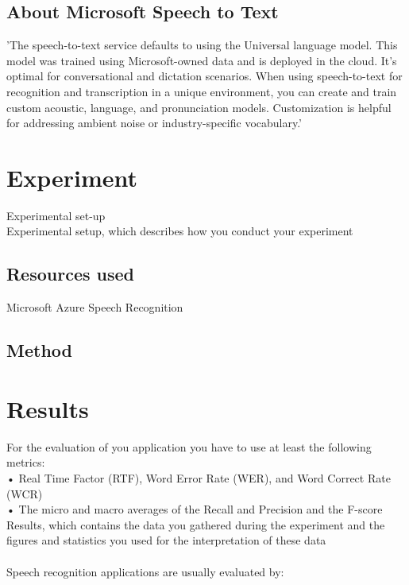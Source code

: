 \documentclass{article}
\begin{document}
\subsection{About Microsoft Speech to Text}
'The speech-to-text service defaults to using the Universal language model. This model was trained using Microsoft-owned data and is deployed in the cloud. It's optimal for conversational and dictation scenarios. When using speech-to-text for recognition and transcription in a unique environment, you can create and train custom acoustic, language, and pronunciation models. Customization is helpful for addressing ambient noise or industry-specific vocabulary.'\cite{Microsoft}

\section{Experiment}
Experimental set-up \\
Experimental setup, which describes how you conduct your experiment

\subsection{Resources used}
Microsoft Azure Speech Recognition

\subsection{Method}

\section{Results}
For the evaluation of you application you have to use at least the following metrics: \\
• Real Time Factor (RTF), Word Error Rate (WER), and Word Correct Rate (WCR) \\
• The micro and macro averages of the Recall and Precision and the F-score \\

Results, which contains the data you gathered during the experiment and the
figures and statistics you used for the interpretation of these data \\
\\
Speech recognition applications are usually evaluated by:
\end{document}
